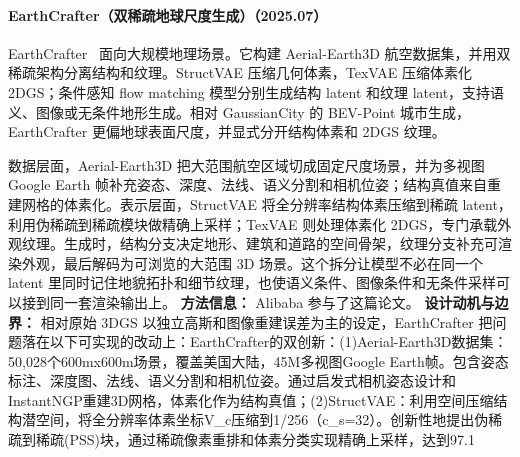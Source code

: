 \paragraph{EarthCrafter（双稀疏地球尺度生成）（2025.07）}
EarthCrafter~\cite{2507_16535} 面向大规模地理场景。它构建 Aerial-Earth3D 航空数据集，并用双稀疏架构分离结构和纹理。StructVAE 压缩几何体素，TexVAE 压缩体素化 2DGS；条件感知 flow matching 模型分别生成结构 latent 和纹理 latent，支持语义、图像或无条件地形生成。相对 GaussianCity 的 BEV-Point 城市生成，EarthCrafter 更偏地球表面尺度，并显式分开结构体素和 2DGS 纹理。

数据层面，Aerial-Earth3D 把大范围航空区域切成固定尺度场景，并为多视图 Google Earth 帧补充姿态、深度、法线、语义分割和相机位姿；结构真值来自重建网格的体素化。表示层面，StructVAE 将全分辨率结构体素压缩到稀疏 latent，利用伪稀疏到稀疏模块做精确上采样；TexVAE 则处理体素化 2DGS，专门承载外观纹理。生成时，结构分支决定地形、建筑和道路的空间骨架，纹理分支补充可渲染外观，最后解码为可浏览的大范围 3D 场景。这个拆分让模型不必在同一个 latent 里同时记住地貌拓扑和细节纹理，也使语义条件、图像条件和无条件采样可以接到同一套渲染输出上。
\textbf{方法信息：} Alibaba 参与了这篇论文。
\textbf{设计动机与边界：} 相对原始 3DGS 以独立高斯和图像重建误差为主的设定，EarthCrafter 把问题落在以下可实现的改动上：EarthCrafter的双创新：(1)Aerial-Earth3D数据集：50,028个600mx600m场景，覆盖美国大陆，45M多视图Google Earth帧。包含姿态标注、深度图、法线、语义分割和相机位姿。通过启发式相机姿态设计和InstantNGP重建3D网格，体素化作为结构真值；(2)StructVAE：利用空间压缩结构潜空间，将全分辨率体素坐标V\_c压缩到1/256（c\_s=32）。创新性地提出伪稀疏到稀疏(PSS)块，通过稀疏像素重排和体素分类实现精确上采样，达到97.1%

